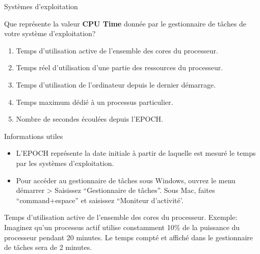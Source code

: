 \begin{section}{Systèmes d'exploitation}
    \begin{Exercice}[5 minutes]
        Que représente la valeur \textbf{CPU Time} donnée par le gestionnaire de tâches de votre système d'exploitation?
        \begin{enumerate}
            \item Temps d'utilisation active de l'ensemble des cores du processeur.
            \item Temps réel d'utilisation d'une partie des ressources du processeur.
            \item Temps d'utilisation de l'ordinateur depuis le dernier démarrage.
            \item Temps maximum dédié à un processus particulier.
            \item Nombre de secondes écoulées depuis l'EPOCH.
        \end{enumerate}
        \begin{Example}{\faLightbulb \quad Informations utiles}
            \begin{itemize}
                \item L'EPOCH représente la date initiale à partir de laquelle est mesuré le temps par les systèmes d'exploitation.
                \item Pour accéder au gestionnaire de tâches sous Windows, ouvrez le menu démarrer > Saisissez ``Gestionnaire de tâches''. Sous Mac, faites ``command+espace'' et saisissez ``Moniteur d'activité'.
            \end{itemize}
            
        \end{Example}
        \begin{solution}
            Temps d'utilisation active de l'ensemble des cores du processeur.
            Exemple: Imaginez qu'un processus actif utilise constamment 10\% de la puissance du processeur pendant 20 minutes. Le temps compté et affiché dans le gestionnaire de tâches sera de 2 minutes.
        \end{solution}
    \end{Exercice}


\end{section}
